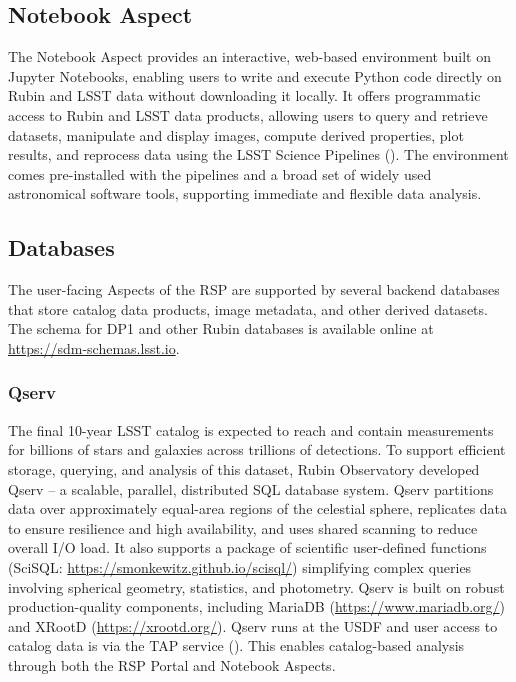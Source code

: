 \subsection{Notebook Aspect
\label{subsec:notebook}}
The Notebook Aspect provides an interactive, web-based environment built on Jupyter Notebooks, enabling users to write and execute Python code directly on Rubin and \gls{LSST} data without downloading it locally. 
It offers programmatic access to Rubin and LSST data products, allowing users to query and retrieve datasets, manipulate and display images, compute derived properties, plot results, and reprocess data using the LSST Science Pipelines (). 
The environment comes pre-installed with the pipelines and a broad set of widely used astronomical software tools, supporting immediate and flexible data analysis.

\subsection{Databases
\label{ssec:databases}}
The user-facing Aspects of the RSP are supported by several backend databases that store catalog data products, image metadata, and other derived datasets. 
The schema for DP1 and other Rubin databases is available online at \url{https://sdm-schemas.lsst.io}.

\subsubsection{Qserv 
\label{sssec:qserv}}
The final 10-year LSST catalog is expected to reach \tenyearcatalogsize and contain measurements for billions of stars and galaxies across trillions of detections. 
To support efficient storage, querying, and analysis of this dataset,  Rubin Observatory developed Qserv \citep{Wang:2011:QDS:2063348.2063364, C15_adassxxxii} -- a scalable, parallel, distributed SQL database system. 
Qserv partitions data over approximately equal-area regions of the celestial sphere, replicates data to ensure resilience and high availability, and uses shared scanning to reduce overall I/O load. 
It also supports a package of scientific user-defined functions (SciSQL: \url{https://smonkewitz.github.io/scisql/}) simplifying complex queries involving spherical geometry, statistics, and photometry.
Qserv is built on robust production-quality components, including MariaDB (\url{https://www.mariadb.org/}) and XRootD (\url{https://xrootd.org/}). 
Qserv runs at the USDF and user access to catalog data is via the TAP service ().
This enables catalog-based analysis through both the RSP Portal and Notebook Aspects.

